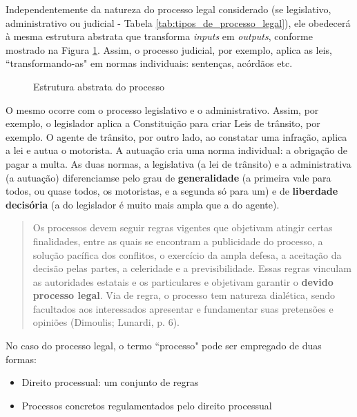\documentclass{article}
\begin{document}
Independentemente da natureza do processo legal considerado (se legislativo, administrativo ou judicial - Tabela \ref{tab:tipos_de_processo_legal}), ele obedecerá à mesma estrutura abstrata que transforma \textit{inputs} em \textit{outputs}, conforme mostrado na Figura \ref{exemplo_de_processo}. Assim, o processo judicial, por exemplo, aplica as leis, ``transformando-as" em normas individuais: sentenças, acórdãos etc.

\begin{figure}
\caption{Estrutura abstrata do processo}\label{exemplo_de_processo}
\end{figure}

O mesmo ocorre com o processo legislativo e o administrativo. Assim, por exemplo, o legislador aplica a Constituição para criar Leis de trânsito, por exemplo. O agente de trânsito, por outro lado, ao constatar uma infração, aplica a lei e autua o motorista. A autuação cria uma norma individual: a obrigação de pagar a multa. As duas normas, a legislativa (a lei de trânsito) e a administrativa (a autuação) diferenciamse pelo grau de \textbf{generalidade} (a primeira vale para todos, ou quase todos, os motoristas, e a segunda só para um) e de \textbf{liberdade decisória} (a do legislador é muito mais ampla que a do agente).

\begin{quote}
    Os processos devem seguir regras vigentes que objetivam atingir certas finalidades, entre as quais se encontram a publicidade do processo, a solução pacífica dos conflitos, o exercício da ampla defesa, a aceitação da decisão pelas partes, a celeridade e a previsibilidade. Essas regras vinculam as autoridades estatais e os particulares e objetivam garantir o \textbf{devido processo legal}. Via de regra, o processo tem natureza dialética, sendo facultados aos interessados apresentar e fundamentar suas pretensões e opiniões (Dimoulis; Lunardi, p. 6).
\end{quote}

No caso do processo legal, o termo ``processo" pode ser empregado de duas formas:

\begin{itemize}
    \item Direito processual: um conjunto de regras
    \item Processos concretos regulamentados pelo direito processual
\end{itemize}
\end{document}
